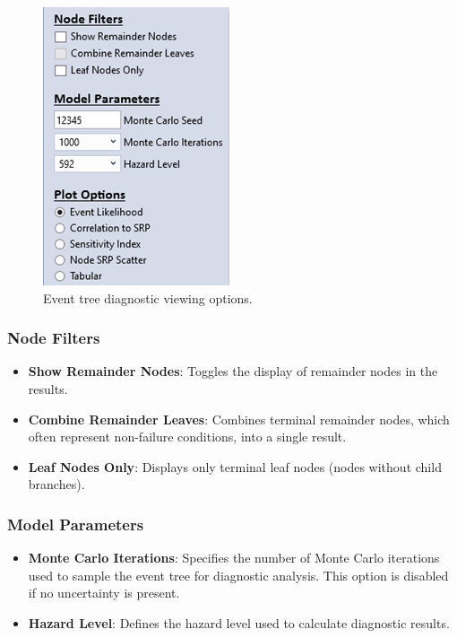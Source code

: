 \documentclass[
]{book}
\begin{document}
\begin{figure}

{\centering \includegraphics{images/figure93} 

}

\caption{Event tree diagnostic viewing options.}\label{fig:figure-93}
\end{figure}

\hypertarget{node-filters}{%
\subsubsection*{Node Filters}\label{node-filters}}

\begin{itemize}
\item
  \textbf{Show Remainder Nodes}: Toggles the display of remainder nodes in the results.
\item
  \textbf{Combine Remainder Leaves}: Combines terminal remainder nodes, which often represent non-failure conditions, into a single result.
\item
  \textbf{Leaf Nodes Only}: Displays only terminal leaf nodes (nodes without child branches).
\end{itemize}

\hypertarget{model-parameters}{%
\subsubsection*{Model Parameters}\label{model-parameters}}

\begin{itemize}
\item
  \textbf{Monte Carlo Iterations}: Specifies the number of Monte Carlo iterations used to sample the event tree for diagnostic analysis. This option is disabled if no uncertainty is present.
\item
  \textbf{Hazard Level}: Defines the hazard level used to calculate diagnostic results.
\end{itemize}
\end{document}
